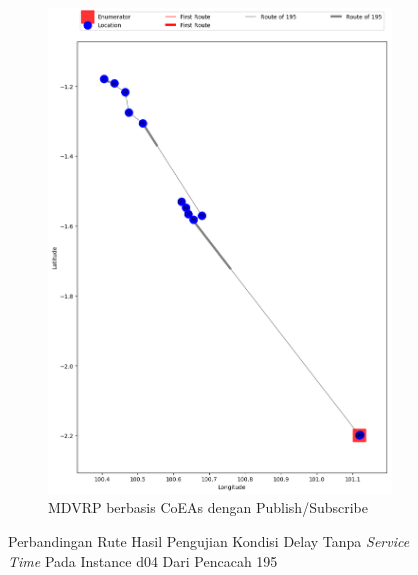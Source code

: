 \begin{figure}[H]\ContinuedFloat
	\centering
	\begin{subfigure}[t]{\textwidth}
		\centering
		\includegraphics[width=\textwidth]{Resources/Images/delayed_4/real_m15_n100_delayed_4_195_pubsub_coes}
		\caption{MDVRP berbasis CoEAs dengan Publish/Subscribe}
		\label{fig:real_m15_n100_delayed_4_195_pubsub_coes}
	\end{subfigure}
	\caption{Perbandingan Rute Hasil Pengujian Kondisi Delay Tanpa \textit{Service Time} Pada Instance d04 Dari Pencacah 195}
	\label{fig:real_m15_n100_delayed_4_195_contd}
\end{figure}



